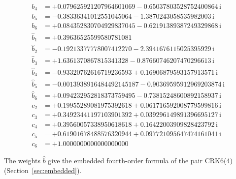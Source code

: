 {\begin{align*}
b_{4} &= +0.079625921207964601069 - 0.65037803528752400864\,\mathrm{i}\\
b_{5} &= -0.38336341012551045064 - 1.3870243058535982003\,\mathrm{i}\\
b_{6} &= +0.084352830704929837045 - 0.62191389387249329868\,\mathrm{i}\\[1mm]
\hat b_{1} &= +0.39636525599580781081\\
\hat b_{2} &= -0.19213377778007412270 - 2.3941676115025395929\,\mathrm{i}\\
\hat b_{3} &= +1.6361370867815341328 - 0.87660746207470296613\,\mathrm{i}\\
\hat b_{4} &= -0.93320762616719236593 + 0.16906879593157913571\,\mathrm{i}\\
\hat b_{5} &= -0.0013938916484492145187 - 0.90369595912969203874\,\mathrm{i}\\
\hat b_{6} &= +0.094232952818373759495 - 0.73815248600892158937\,\mathrm{i}\\[1mm]
c_{2} &= +0.19955289081975392618 + 0.061716592008779599816\,\mathrm{i}\\
c_{3} &= +0.34923441197103901392 + 0.039296149891396695127\,\mathrm{i}\\
c_{4} &= +0.39560057338950618618 + 0.16422003909828423792\,\mathrm{i}\\
c_{5} &= +0.61901678488576320944 + 0.097721095647474161041\,\mathrm{i}\\
c_{6} &= +1.0000000000000000000
\end{align*}
}

The weights $\hat b$ give the embedded fourth-order formula of the pair CRK6(4) (Section~\ref{sec:embedded}).
